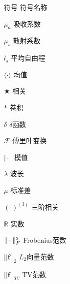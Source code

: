\begin{englishabstract}
\end{englishabstract}


\XDUpremainmatter

\begin{symbollist}
\item [符号] \hspace{12em} {符号名称}
\item [$\mu_{a}$]\hspace{12.5em} {吸收系数}
\item [$\mu_{s}$]\hspace{12.5em} {散射系数}
\item [$l_{s}$] \hspace{12.5em} {平均自由程}
\item [$\langle \cdot \rangle$] \hspace{12.5em} {均值}
\item [$\bigstar$] \hspace{12.5em} {相关}
\item [$*$] \hspace{12.5em} {卷积}
\item [$\delta$] \hspace{12.5em} {$\delta$函数}
\item [$\mathcal{F}$] \hspace{12.5em} {傅里叶变换}
\item [$\mid \cdot \mid $] \hspace{12.5em} {模值}
\item [$\lambda$] \hspace{12.5em} {波长}
\item [$\mu$] \hspace{12.5em} {标准差}
\item [$(\cdot)^{(3)}$] \hspace{12.5em} {三阶相关}
\item [$\mathbb{R} $] \hspace{12.5em} {实数}
\item [$\Arrowvert \cdot \Arrowvert_F^{2}$] \hspace{12.5em} {Frobenius范数}
\item [$\vert\vert \mathbf{f}\vert\vert_2  $] \hspace{12.5em} {$L_{2}$向量范数}
\item [$\vert\vert \mathbf{f} \vert\vert_{TV} $] \hspace{12.5em} {TV范数}
\end{symbollist}

